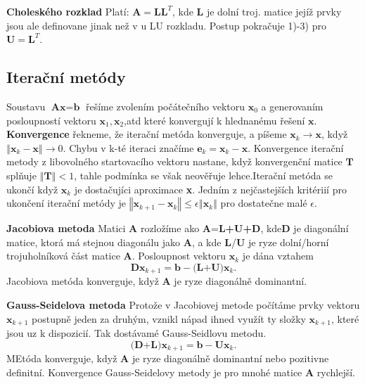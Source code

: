 \documentclass[a4]{report}
\theoremstyle{definition}
\begin{document}
{\textbf{Choleského rozklad}
Platí: $\textbf{A}=\textbf{L}\textbf{L}^{T}$, kde \textbf{L} je dolní troj. matice jejíž prvky jsou ale definovane jinak než v u LU rozkladu. Postup pokračuje 1)-3) pro $\textbf{U}=\textbf{L}^{T}.$
\newline
\subsection{Iterační metódy}
Soustavu $\textbf{Ax}=\textbf{b}$ řešíme zvolením počátečního vektoru $\textbf{x}_{0}$ a generovaním posloupností vektoru $\textbf{x}_{1},\textbf{x}_{2}$,atd které konvergují k hlednanému řešení $\textbf{x}$. 
\newline\textbf{Konvergence}
\newline
řekneme, že iterační metóda konverguje, a píšeme $\textbf{x}_{k} \rightarrow\textbf{x}$, když  $\left\Vert\textbf{x}_{k}-\textbf{x}\right\Vert\rightarrow 0$. Chybu v k-té iteraci značíme $\textbf{e}_{k}=\textbf{x}_{k}-\textbf{x}$. Konvergence iterační metody z libovolného startovacího vektoru nastane, když konvergenční matice $\textbf{T}$ splňuje $\left\Vert\textbf{T}\right\Vert<1$, tahle podmínka se však neověřuje lehce.\newline Iterační metóda se ukončí když $\textbf{x}_{k}$ je dostačujíci aproximace \textbf{x}. Jedním z nejčastejších kritériií pro ukončení iterační metódy je  $\left\Vert\textbf{x}_{k+1}-\textbf{x}_{k}\right\Vert\leq \epsilon\left\Vert\textbf{x}_{k}\right\Vert$ pro dostatečne malé $\epsilon$.

\textbf{Jacobiova metoda}
\newline Matici \textbf{A} rozložíme ako \textbf{A}=\textbf{L+U+D}, kde\textbf{D} je diagonální matice, ktorá má stejnou diagonálu jako \textbf{A}, a kde \textbf{L}/\textbf{U} je ryze dolní/horní trojuholníková část matice \textbf{A}. Posloupnost vektoru $\textbf{x}_{k}$ je dána vztahem $$\textbf{D}\textbf{x}_{k+1}=\textbf{b}-\textbf{(L+U)}\textbf{x}_{k}.$$ Jacobiova metóda konverguje, když \textbf{A} je ryze diagonálně dominantní.

\textbf{Gauss-Seidelova metoda}\newline
Protože v Jacobiovej metode počítáme prvky vektoru  $\textbf{x}_{k+1}$ postupně jeden za druhým, vznikl nápad ihned využít ty složky  $\textbf{x}_{k+1}$, které jsou uz k dispozicií. Tak dostávamé Gauss-Seidlovu metodu. $$\textbf{(D+L)}\textbf{x}_{k+1}=\textbf{b}-\textbf{U}\textbf{x}_{k}.$$ MEtóda konverguje, když \textbf{A} je ryze diagonálně dominantní nebo pozitivne definitní. 
\newline Konvergence Gauss-Seidelovy metody je pro mnohé matice \textbf{A} rychlejší.

}
\end{document}
